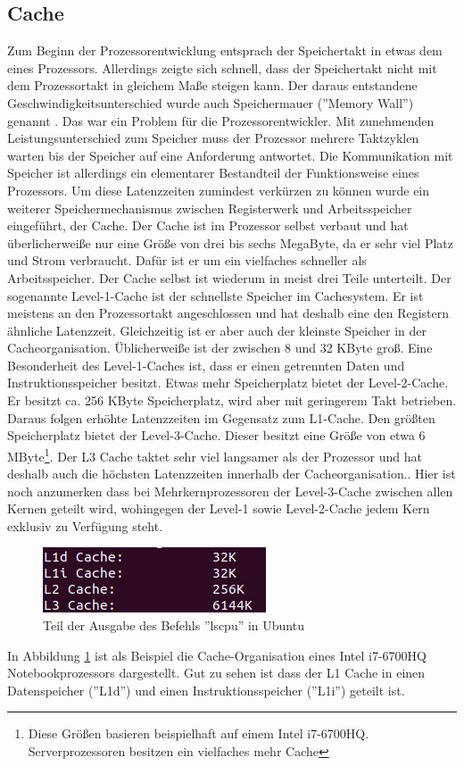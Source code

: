\documentclass[12pt]{article}
\begin{document}
\subsection{Cache}
Zum Beginn der Prozessorentwicklung entsprach der Speichertakt in etwas dem eines Prozessors. Allerdings zeigte sich schnell, dass der Speichertakt nicht mit dem Prozessortakt in gleichem Maße steigen kann. Der daraus entstandene Geschwindigkeitsunterschied wurde auch Speichermauer (''Memory Wall'') genannt \cite{mckee2004reflections}.
Das war ein Problem für die Prozessorentwickler. Mit zunehmenden Leistungsunterschied zum Speicher muss der Prozessor mehrere Taktzyklen warten bis der Speicher auf eine Anforderung antwortet. Die Kommunikation mit Speicher ist allerdings ein elementarer Bestandteil der Funktionsweise eines Prozessors. Um diese Latenzzeiten zumindest verkürzen zu können wurde ein weiterer Speichermechanismus zwischen Registerwerk und Arbeitsspeicher eingeführt, der Cache. Der Cache ist im Prozessor selbst verbaut und hat überlicherweiße nur eine Größe von drei bis sechs MegaByte, da er sehr viel Platz und Strom verbraucht. Dafür ist er um ein vielfaches schneller als Arbeitsspeicher. Der Cache selbst ist wiederum in meist drei Teile unterteilt. Der sogenannte Level-1-Cache ist der schnellste Speicher im Cachesystem. Er ist meistens an den Prozessortakt angeschlossen und hat deshalb eine den Registern ähnliche Latenzzeit. Gleichzeitig ist er aber auch der kleinste Speicher in der Cacheorganisation. 
Üblicherweiße ist der zwischen 8 und 32 KByte groß. Eine Besonderheit des Level-1-Caches ist, dass er  einen getrennten Daten und Instruktionsspeicher besitzt. Etwas mehr Speicherplatz bietet der Level-2-Cache. Er besitzt ca. 256 KByte Speicherplatz, wird aber mit geringerem Takt betrieben. Daraus folgen erhöhte Latenzzeiten im Gegensatz zum L1-Cache. Den größten Speicherplatz bietet der Level-3-Cache. Dieser besitzt eine Größe von etwa 6 MByte\footnote{Diese Größen basieren beispielhaft auf einem Intel i7-6700HQ. Serverprozessoren besitzen ein vielfaches mehr Cache}. Der L3 Cache taktet sehr viel langsamer als der Prozessor und hat deshalb auch die höchsten Latenzzeiten innerhalb der Cacheorganisation.\cite{molka2009memory}. Hier ist noch anzumerken dass bei Mehrkernprozessoren der Level-3-Cache zwischen allen Kernen geteilt wird, wohingegen der Level-1 sowie Level-2-Cache jedem Kern exklusiv zu Verfügung steht.


\begin{figure}[!htb]
\centering
\includegraphics[scale=0.5]{lscpu}
\caption{Teil der Ausgabe des Befehls ''lscpu'' in Ubuntu}
\centering
\label{fig:lscpu}
\end{figure}
In Abbildung \ref{fig:lscpu} ist als Beispiel die Cache-Organisation eines Intel i7-6700HQ Notebookprozessors dargestellt. Gut zu sehen ist dass der L1 Cache in einen Datenspeicher (''L1d'') und einen Instruktionsspeicher (''L1i'') geteilt ist. 
\end{document}
